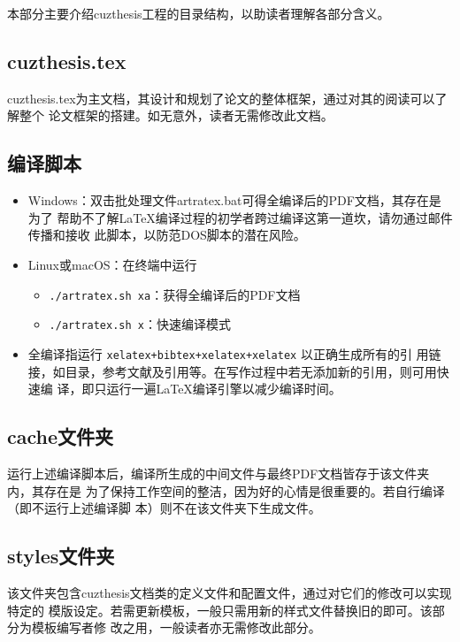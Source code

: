 本部分主要介绍cuzthesis工程的目录结构，以助读者理解各部分含义。

\subsection{cuzthesis.tex}

cuzthesis.tex为主文档，其设计和规划了论文的整体框架，通过对其的阅读可以了解整个
论文框架的搭建。如无意外，读者无需修改此文档。

\subsection{编译脚本}

\begin{itemize}
    \item Windows：双击批处理文件artratex.bat可得全编译后的PDF文档，其存在是为了
    帮助不了解\LaTeX{}编译过程的初学者跨过编译这第一道坎，请勿通过邮件传播和接收
    此脚本，以防范DOS脚本的潜在风险。
    \item Linux或macOS：在终端中运行
        \begin{itemize}
            \item \verb|./artratex.sh xa|：获得全编译后的PDF文档
            \item \verb|./artratex.sh x|：快速编译模式
        \end{itemize}
    \item 全编译指运行 \verb|xelatex+bibtex+xelatex+xelatex| 以正确生成所有的引
    用链接，如目录，参考文献及引用等。在写作过程中若无添加新的引用，则可用快速编
    译，即只运行一遍\LaTeX{}编译引擎以减少编译时间。
\end{itemize}

\subsection{cache文件夹}

运行上述编译脚本后，编译所生成的中间文件与最终PDF文档皆存于该文件夹内，其存在是
为了保持工作空间的整洁，因为好的心情是很重要的。若自行编译（即不运行上述编译脚
本）则不在该文件夹下生成文件。

\subsection{styles文件夹}

该文件夹包含cuzthesis文档类的定义文件和配置文件，通过对它们的修改可以实现特定的
模版设定。若需更新模板，一般只需用新的样式文件替换旧的即可。该部分为模板编写者修
改之用，一般读者亦无需修改此部分。


